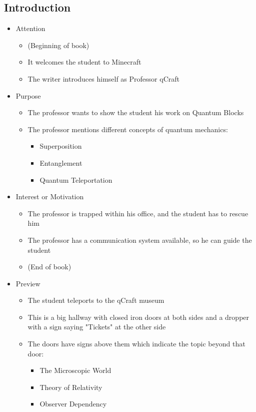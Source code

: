 \documentclass[11pt,twoside]{report} %
\begin{document}
\subsection{Introduction}

\begin{itemize}
	\item Attention
	\begin{itemize}
		\item (Beginning of book)
		\item It welcomes the student to Minecraft
		\item The writer introduces himself as Professor qCraft
	\end{itemize}
	\item Purpose
	\begin{itemize}
		\item The professor wants to show the student his work on Quantum Blocks
		\item The professor mentions different concepts of quantum mechanics:
		\begin{itemize}
			\item Superposition
			\item Entanglement
			\item Quantum Teleportation
		\end{itemize}
	\end{itemize}
	\item Interest or Motivation
	\begin{itemize}
		\item The professor is trapped within his office, and the student has to rescue him
		\item The professor has a communication system available, so he can guide the student
		\item (End of book)
	\end{itemize}
	\item Preview
	\begin{itemize}
		\item The student teleports to the qCraft museum
		\item This is a big hallway with closed iron doors at both sides and a dropper with a sign saying "Tickets" at the other side
		\item The doors have signs above them which indicate the topic beyond that door:
		\begin{itemize}
			\item The Microscopic World
			\item Theory of Relativity
			\item Observer Dependency

\end{itemize}
\end{itemize}
\end{itemize}
\end{document}
